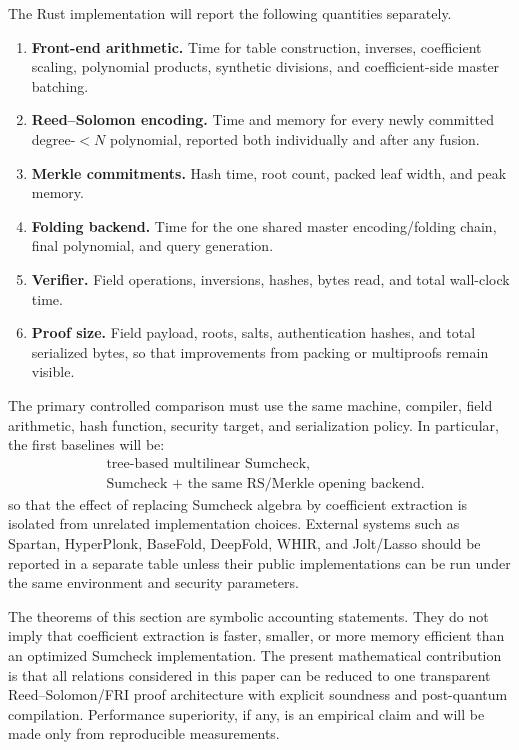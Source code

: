 The Rust implementation will report the following quantities separately.

\begin{enumerate}[label=(\arabic*),leftmargin=*]
  \item \textbf{Front-end arithmetic.}  Time for table construction, inverses, coefficient scaling, polynomial products, synthetic divisions, and coefficient-side master batching.
  \item \textbf{Reed--Solomon encoding.}  Time and memory for every newly committed degree-$<N$ polynomial, reported both individually and after any fusion.
  \item \textbf{Merkle commitments.}  Hash time, root count, packed leaf width, and peak memory.
  \item \textbf{Folding backend.}  Time for the one shared master encoding/folding chain, final polynomial, and query generation.
  \item \textbf{Verifier.}  Field operations, inversions, hashes, bytes read, and total wall-clock time.
  \item \textbf{Proof size.}  Field payload, roots, salts, authentication hashes, and total serialized bytes, so that improvements from packing or multiproofs remain visible.
\end{enumerate}

The primary controlled comparison must use the same machine, compiler, field arithmetic, hash function, security target, and serialization policy.  In particular, the first baselines will be:
\begin{equation}
\begin{aligned}
  &\text{tree-based multilinear Sumcheck},\\
  &\text{Sumcheck + the same RS/Merkle opening backend}.
\end{aligned}
  \label{eq:benchmark-primary-baselines}
\end{equation}
so that the effect of replacing Sumcheck algebra by coefficient extraction is isolated from unrelated implementation choices.  External systems such as Spartan, HyperPlonk, BaseFold, DeepFold, WHIR, and Jolt/Lasso should be reported in a separate table unless their public implementations can be run under the same environment and security parameters.

\begin{remark}
\label{rem:no-benchmark-claim}
The theorems of this section are symbolic accounting statements.  They do not imply that coefficient extraction is faster, smaller, or more memory efficient than an optimized Sumcheck implementation.  The present mathematical contribution is that all relations considered in this paper can be reduced to one transparent Reed--Solomon/FRI proof architecture with explicit soundness and post-quantum compilation.  Performance superiority, if any, is an empirical claim and will be made only from reproducible measurements.
\end{remark}

